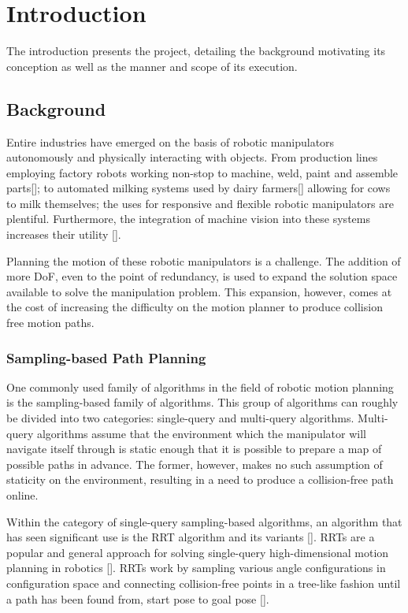 \chapter{Introduction} \label{ch1:introduction} 
The introduction presents the project, detailing the background motivating its conception as well as the manner and scope of its execution.

\section{Background} \label{subsec:backg}
Entire industries have emerged on the basis of robotic manipulators autonomously and physically interacting with objects. From production lines employing factory robots working non-stop to machine, weld, paint and assemble parts[\citeauthor{Appleton1987}]; to automated milking systems used by dairy farmers[\citeauthor{Rossing1997}] allowing for cows to milk themselves; the uses for responsive and flexible robotic manipulators are plentiful. Furthermore, the integration of machine vision into these systems increases their utility [\citeauthor{Snyder2010}].

Planning the motion of these robotic manipulators is a challenge. The addition of more \gls{DoF}, even to the point of redundancy, is used to expand the solution space available to solve the manipulation problem. This expansion, however, comes at the cost of increasing the difficulty on the motion planner to produce collision free motion paths.

\subsection*{Sampling-based Path Planning}

One commonly used family of algorithms in the field of robotic motion planning is the sampling-based family of algorithms. This group of algorithms can roughly be divided into two categories: single-query and multi-query algorithms. Multi-query algorithms assume that the environment which the manipulator will navigate itself through is static enough that it is possible to prepare a map of possible paths in advance. The former, however, makes no such assumption of staticity on the environment, resulting in a need to produce a collision-free path online.

Within the category of single-query sampling-based algorithms, an algorithm that has seen significant use is the \gls{RRT} algorithm and its variants  [\citeauthor{Siciliano2016}]. \gls{RRT}s are a popular and general approach for solving single-query high-dimensional motion planning in robotics [\citeauthor{Bialkowski2013}]. \gls{RRT}s work by sampling various angle configurations in configuration space and connecting collision-free points in a tree-like fashion until a path has been found from, start pose to goal pose [\citeauthor{LaValle1998}].

